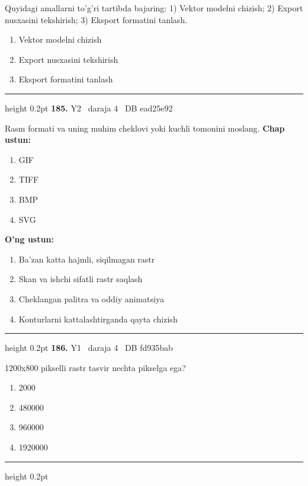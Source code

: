 \documentclass[10pt,a4paper,oneside]{article}
\begin{document}
\par
Quyidagi amallarni to'g'ri tartibda bajaring: 1) Vektor modelni chizish; 2) Export nusxasini tekshirish; 3) Eksport formatini tanlash.
\begin{enumerate}[label=\Alph*),leftmargin=9mm]
\item Vektor modelni chizish
\item Export nusxasini tekshirish
\item Eksport formatini tanlash
\end{enumerate}
\vspace{2mm}\hrule height 0.2pt \vspace{4mm}
\hypertarget{q185}{\textbf{\color{ink}185.}}  {\color{muted}\scriptsize Y2 \textbullet\ daraja 4 \textbullet\ DB ead25e92}
\par
Rasm formati va uning muhim cheklovi yoki kuchli tomonini moslang.
\textbf{\footnotesize Chap ustun:}
\begin{enumerate}[label=\arabic*),leftmargin=9mm]
\item GIF
\item TIFF
\item BMP
\item SVG
\end{enumerate}
\textbf{\footnotesize O'ng ustun:}
\begin{enumerate}[label=\Alph*),leftmargin=9mm]
\item Ba'zan katta hajmli, siqilmagan rastr
\item Skan va ishchi sifatli rastr saqlash
\item Cheklangan palitra va oddiy animatsiya
\item Konturlarni kattalashtirganda qayta chizish
\end{enumerate}
\vspace{2mm}\hrule height 0.2pt \vspace{4mm}
\hypertarget{q186}{\textbf{\color{ink}186.}}  {\color{muted}\scriptsize Y1 \textbullet\ daraja 4 \textbullet\ DB fd935bab}
\par
1200x800 pikselli rastr tasvir nechta pikselga ega?
\begin{enumerate}[label=\Alph*),leftmargin=9mm]
\item 2000
\item 480000
\item 960000
\item 1920000
\end{enumerate}
\vspace{2mm}\hrule height 0.2pt \vspace{4mm}
\end{document}
